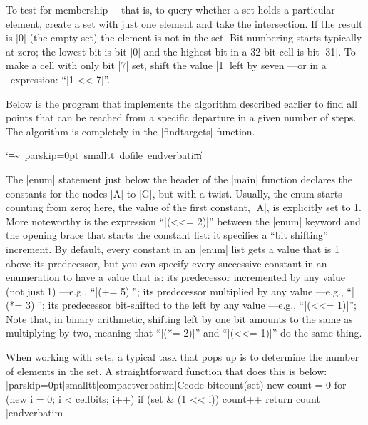 To test for membership ---that is, to query whether a set holds a particular
element, create a set with just one element and take the intersection.
If the result is |0| (the empty set) the element is not in the set. Bit
numbering starts typically at zero; the lowest bit is bit |0|
and the highest bit in a 32-bit cell is bit |31|. To make a cell with only
bit |7| set, shift the value |1| left by seven ---or in a \Small\ expression:
``|1 << 7|''.

Below is the program that implements the algorithm described earlier to find
all points that can be reached from a specific departure in a given number of
steps. The algorithm is completely in the |findtargets| function.

\bigskip{}
\begingroup\catcode`\|=\other\verbatimescapechar\~
\verbatim~parskip=0pt~smalltt~dofile~endverbatim\verbatimescapechar\|\endlistingx
\endgroup

 
\noindent{}%
The |enum| statement just below the header of the |main| function declares the
constants for the nodes |A| to |G|, but with a twist. Usually, the enum starts
counting from zero; here, the value of the first constant, |A|, is explicitly
set to 1. More noteworthy is the expression ``|(<<= 2)|'' between the |enum|
keyword and the opening brace that starts the constant list: it specifies a
``bit shifting'' increment. By default, every constant in an |enum| list gets a
value that is 1 above its predecessor, but you can specify every successive
constant in an enumeration to have a value that is:
\beginlist{1em}\compactlist
\list{\lbullet}
  its predecessor incremented by any value (not just 1) ---e.g., ``|(+= 5)|'';
\list{\lbullet}
  its predecessor multiplied by any value ---e.g., ``|(*= 3)|'';
\list{\lbullet}
  its predecessor bit-shifted to the left by any value ---e.g., ``|(<<= 1)|'';
\endlist
{}
Note that, in binary arithmetic, shifting left by one bit amounts to the same
as multiplying by two, meaning that ``|(*= 2)|'' and ``|(<<= 1)|'' do the same
thing.

\noindent{}%
When working with sets, a typical task that pops up is to determine the number
of elements in the set. A straightforward function that does this is below:
\listingx\verbatim|parskip=0pt|smalltt|compactverbatim|Ccode
bitcount(set)
    {
    new count = 0
    for (new i = 0; i < cellbits; i++)
        if (set & (1 << i))
            count++
    return count
    }
|endverbatim\endlistingx

